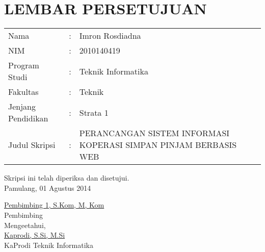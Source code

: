 %
\doublespacing
\chapter*{\uppercase{LEMBAR PERSETUJUAN}}
\vspace{1cm}

\renewcommand{\arraystretch}{1.5}
\begin{table}[ht]
\begin{adjustwidth}{-0.15cm}{}
	\begin{tabularx}{\textwidth}{llX}
		Nama & : & Imron Rosdiadna \\
		NIM & : & 2010140419 \\
		Program Studi & : & Teknik Informatika \\
		Fakultas & : & Teknik \\
		Jenjang Pendidikan & : & Strata 1 \\
		Judul Skripsi & : & PERANCANGAN SISTEM INFORMASI KOPERASI SIMPAN PINJAM BERBASIS WEB
	\end{tabularx}
\end{adjustwidth}
\end{table}

\noindent Skripsi ini telah diperiksa dan disetujui. \\
Pamulang, 01 Agustus 2014

\vspace{3cm}
\begin{center}
\begin{minipage}{\linewidth}\centering
\underline{Pembimbing 1, S.Kom, M, Kom} \\
Pembimbing \\
\vspace{1cm}
Mengeetahui, \\
\vspace{3cm}
\underline{Kaprodi, S.Si, M.Si} \\
KaProdi Teknik Informatika
\end{minipage}
\end{center}

\newpage
\onehalfspacing